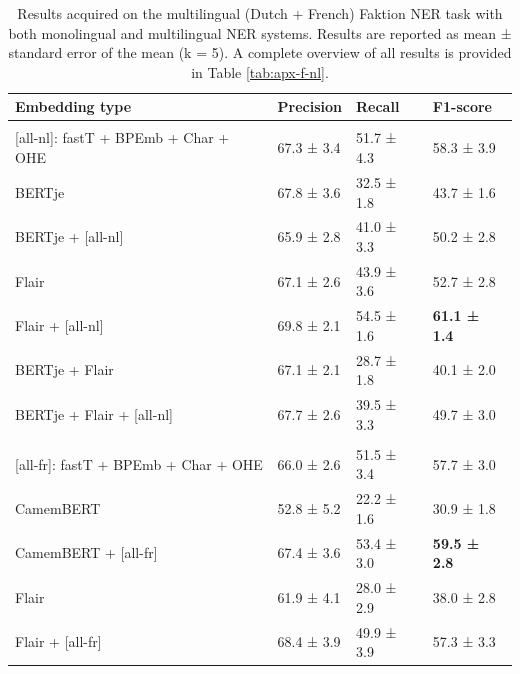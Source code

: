 \documentclass[12pt,a4paper,]{book}
\begin{document}
\begin{table}

\caption{\label{tab:faktion-bi-tab}Results acquired on the multilingual (Dutch + French) Faktion NER task with both monolingual and multilingual NER systems. Results are reported as mean ± standard error of the mean (k = 5). A complete overview of all results is provided in Table \ref{tab:apx-f-nl}.}
\centering
\begin{tabular}[t]{llll}
\toprule
Embedding type & Precision & Recall & F1-score\\
\midrule
\addlinespace[0.3em]
\multicolumn{4}{l}{\textbf{Monolingual Dutch embeddings}}\\
\hspace{1em}[all-nl]: fastT + BPEmb + Char + OHE & 67.3 ± 3.4 & 51.7 ± 4.3 & 58.3 ± 3.9\\
\hspace{1em}BERTje & 67.8 ± 3.6 & 32.5 ± 1.8 & 43.7 ± 1.6\\
\hspace{1em}BERTje + [all-nl] & 65.9 ± 2.8 & 41.0 ± 3.3 & 50.2 ± 2.8\\
\hspace{1em}Flair & 67.1 ± 2.6 & 43.9 ± 3.6 & 52.7 ± 2.8\\
\hspace{1em}Flair + [all-nl] & 69.8 ± 2.1 & 54.5 ± 1.6 & \textbf{61.1 ± 1.4}\\
\hspace{1em}BERTje + Flair & 67.1 ± 2.1 & 28.7 ± 1.8 & 40.1 ± 2.0\\
\hspace{1em}BERTje + Flair + [all-nl] & 67.7 ± 2.6 & 39.5 ± 3.3 & 49.7 ± 3.0\\
\addlinespace[0.3em]
\multicolumn{4}{l}{\textbf{Monolingual French embeddings}}\\
\hspace{1em}[all-fr]: fastT + BPEmb + Char + OHE & 66.0 ± 2.6 & 51.5 ± 3.4 & 57.7 ± 3.0\\
\hspace{1em}CamemBERT & 52.8 ± 5.2 & 22.2 ± 1.6 & 30.9 ± 1.8\\
\hspace{1em}CamemBERT + [all-fr] & 67.4 ± 3.6 & 53.4 ± 3.0 & \textbf{59.5 ± 2.8}\\
\hspace{1em}Flair & 61.9 ± 4.1 & 28.0 ± 2.9 & 38.0 ± 2.8\\
\hspace{1em}Flair + [all-fr] & 68.4 ± 3.9 & 49.9 ± 3.9 & 57.3 ± 3.3\\

\end{tabular}
\end{table}
\end{document}
